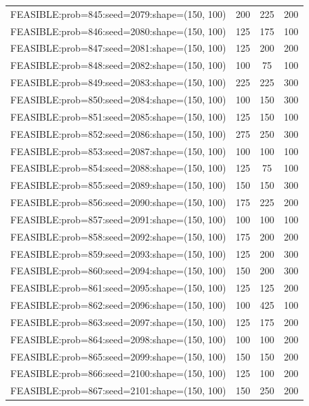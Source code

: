 \begin{longtable}{lccc}
FEASIBLE:prob=845:seed=2079:shape=(150, 100) &      200 &   225 &    200 \\
FEASIBLE:prob=846:seed=2080:shape=(150, 100) &      125 &   175 &    100 \\
FEASIBLE:prob=847:seed=2081:shape=(150, 100) &      125 &   200 &    200 \\
FEASIBLE:prob=848:seed=2082:shape=(150, 100) &      100 &    75 &    100 \\
FEASIBLE:prob=849:seed=2083:shape=(150, 100) &      225 &   225 &    300 \\
FEASIBLE:prob=850:seed=2084:shape=(150, 100) &      100 &   150 &    300 \\
FEASIBLE:prob=851:seed=2085:shape=(150, 100) &      125 &   150 &    100 \\
FEASIBLE:prob=852:seed=2086:shape=(150, 100) &      275 &   250 &    300 \\
FEASIBLE:prob=853:seed=2087:shape=(150, 100) &      100 &   100 &    100 \\
FEASIBLE:prob=854:seed=2088:shape=(150, 100) &      125 &    75 &    100 \\
FEASIBLE:prob=855:seed=2089:shape=(150, 100) &      150 &   150 &    300 \\
FEASIBLE:prob=856:seed=2090:shape=(150, 100) &      175 &   225 &    200 \\
FEASIBLE:prob=857:seed=2091:shape=(150, 100) &      100 &   100 &    100 \\
FEASIBLE:prob=858:seed=2092:shape=(150, 100) &      175 &   200 &    200 \\
FEASIBLE:prob=859:seed=2093:shape=(150, 100) &      125 &   200 &    300 \\
FEASIBLE:prob=860:seed=2094:shape=(150, 100) &      150 &   200 &    300 \\
FEASIBLE:prob=861:seed=2095:shape=(150, 100) &      125 &   125 &    200 \\
FEASIBLE:prob=862:seed=2096:shape=(150, 100) &      100 &   425 &    100 \\
FEASIBLE:prob=863:seed=2097:shape=(150, 100) &      125 &   175 &    200 \\
FEASIBLE:prob=864:seed=2098:shape=(150, 100) &      100 &   100 &    200 \\
FEASIBLE:prob=865:seed=2099:shape=(150, 100) &      150 &   150 &    200 \\
FEASIBLE:prob=866:seed=2100:shape=(150, 100) &      125 &   100 &    200 \\
FEASIBLE:prob=867:seed=2101:shape=(150, 100) &      150 &   250 &    200 \\

\end{longtable}
